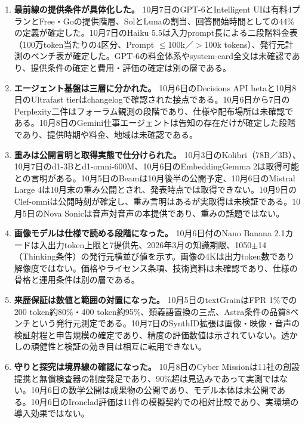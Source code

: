 \begin{enumerate}[leftmargin=1.6em]
\item \textbf{最前線の提供条件が具体化した。} 10月7日のGPT-6とIntelligent UIは有料4プランとFree・Goの提供階層、SolとLunaの割当、回答開始時間としての44\%の定義が確定した\cite{gpt6ui}。10月7日のHaiku 5.5は入力prompt長による二段階料金表（100万token当たりの4区分、Prompt $\le$100k／$>$100k tokens）、発行元計測のベンチ表が確定した\cite{haiku55}。GPT-6の料金体系やsystem-card全文は未確認であり、提供条件の確定と費用・評価の確定は別の層である。
\item \textbf{エージェント基盤は三層に分かれた。} 10月6日のDecisions API betaと10月8日のUltrafast tierはchangelogで確認された接点である\cite{decisions}\cite{ultrafast}。10月6日から7日のPerplexity二件はフォーラム観測の段階であり、仕様や配布場所は未確認である\cite{pplxdecider}\cite{pplxembed}。10月8日のGemini仕事エージェントは告知の存在だけが確定した段階であり、提供時期や料金、地域は未確認である\cite{geminiagent}。
\item \textbf{重みは公開言明と取得実態で仕分けられた。} 10月3日のKolibri（78B／3B）、10月7日のd1-3Bとd1-omni-600M、10月6日のEmbeddingGemma 2は取得可能との言明がある\cite{kolibri}\cite{liquidd1}\cite{embedgemma2}。10月5日のBeamは10月後半の公開予定、10月6日のMistral Large 4は10月末の重み公開とされ、発表時点では取得できない\cite{beam}\cite{mistral4}。10月9日のClef-omniは公開時刻が確定し、重み言明はあるが実取得は未検証である\cite{clefomni}。10月5日のNova Sonicは音声対音声の本提供であり、重みの話題ではない\cite{novasonic}。
\item \textbf{画像モデルは仕様で読める段階になった。} 10月6日付のNano Banana 2.1カードは入出力token上限と7提供先、2026年3月の知識期限、1050$\pm$14（Thinking条件）の発行元横並び値を示す\cite{nanobanana}。画像の4Kは出力token数であり解像度ではない。価格やライセンス条項、技術資料は未確認であり、仕様の骨格と運用条件は別の層である。
\item \textbf{来歴保証は数値と範囲の対置になった。} 10月5日のtextGrainはFPR 1\%での200 token約80\%・400 token約95\%、類義語置換の三点、Astra条件の品質8ベンチという発行元測定である\cite{textgrain}。10月7日のSynthID拡張は画像・映像・音声の検証射程と申告規模の確定であり、精度の評価数値は示されていない\cite{synthid}。透かしの頑健性と検証の効き目は相互に転用できない。
\item \textbf{守りと探究は境界線の確認になった。} 10月8日のCyber Missionは11社の創設提携と無償検査器の制度発足であり、90\%超は見込みであって実測ではない\cite{cybermission}。10月6日の数学公開は成果物の公開であり、モデル本体は未公開である\cite{mathrelease}。10月6日のIronclad評価は11件の模擬契約での相対比較であり、実環境の導入効果ではない\cite{ironclad}。
\end{enumerate}

